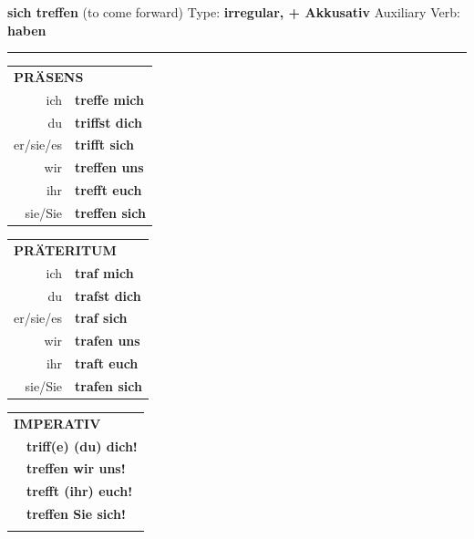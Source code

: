 \documentclass[10pt,a4paper]{revtex4-2}
\begin{document}
\begin{verbbox-acc}
        {\Large \bf sich treffen} (to come forward) \hfill Type: \textbf{irregular, + Akkusativ} \hfill Auxiliary Verb: \textbf{haben} 
    
       \vspace{5pt}

    \hrule
    
    \vspace{5pt}

  \begin{tabular}{rl}
     \multicolumn{2}{l}{\textbf{PRÄSENS} }\\
    ich & \textbf{treffe mich}\\
    du & \textbf{triffst dich}\\
    er/sie/es & \textbf{trifft sich}\\
    wir & \textbf{treffen uns}\\
    ihr & \textbf{trefft euch}\\
    sie/Sie & \textbf{treffen sich}\\
  \end{tabular}
  \hfill
     \begin{tabular}{rl}
    \multicolumn{2}{l}{\textbf{PRÄTERITUM} }\\
    ich & \textbf{traf mich}\\
    du & \textbf{trafst dich}\\
    er/sie/es & \textbf{traf sich}\\
    wir & \textbf{trafen uns}\\
    ihr & \textbf{traft euch}\\
    sie/Sie & \textbf{trafen sich}\\
  \end{tabular}
  \hfill
  \begin{tabular}{rl}
     \multicolumn{2}{l}{\textbf{IMPERATIV} }\\
   & \textbf{triff(e) (du) dich!}\\
   & \textbf{treffen wir uns!}\\
   & \textbf{trefft (ihr) euch!}\\
   & \textbf{treffen Sie sich!}\\
   & \vspace{10pt}
  \end{tabular}

    \vspace{10pt}


\end{verbbox-acc}
\end{document}

